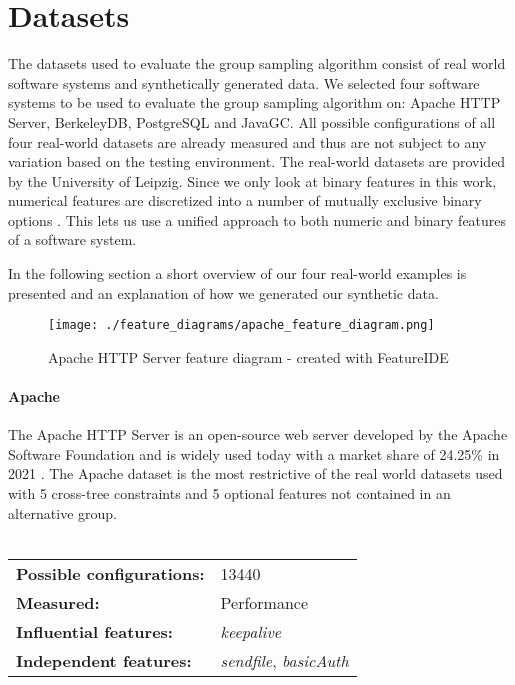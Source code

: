 \documentclass[../../thesis.tex]{subfiles}
\begin{document}
\section{Datasets}
The datasets used to evaluate the group sampling algorithm consist of real world
software systems and synthetically generated data.
We selected four software systems to be used to evaluate the group sampling algorithm on:
Apache HTTP Server, BerkeleyDB, PostgreSQL and JavaGC. All possible configurations of 
all four real-world datasets are already measured and thus are not subject to any variation
based on the testing environment. The real-world datasets are provided by the University of Leipzig.
Since we only look at binary features in this work, numerical
features are discretized into a number of mutually exclusive binary options \cite{siegmund2015performance}.
This lets us use a unified approach to both numeric and binary features of a
software system. 

In the following section a short overview of our four real-world examples is presented and
an explanation of how we generated our synthetic data.


\newpage

\begin{figure}[t]
    \begin{center}
        \texttt{[image: ./feature\_diagrams/apache\_feature\_diagram.png]}
    \end{center}
    \caption[Feature diagram - Apache HTTP Server]{Apache HTTP Server feature diagram - created with FeatureIDE}\label{fig:feature_diagram:apache}
\end{figure}

\paragraph{Apache}
The Apache HTTP Server is an open-source web server developed by the Apache Software Foundation
and is widely used today with a market share of 24.25\% in 2021 \cite{web:apachestatistic}.
The Apache dataset is the most restrictive of the real world datasets used
with 5 cross-tree constraints and 5 optional features not contained in an alternative group.
\\
\\
\begingroup
\renewcommand{\arraystretch}{1.5}
\begin{tabular}{lp{}}
    \textbf{Possible configurations:} & 13440                                 \\
    \textbf{Measured:}                & Performance                           \\
    \textbf{Influential features:}    & \textit{keepalive}                    \\
    \textbf{Independent features:}    & \textit{sendfile}, \textit{basicAuth} \\
\end{tabular}
\endgroup
\end{document}
